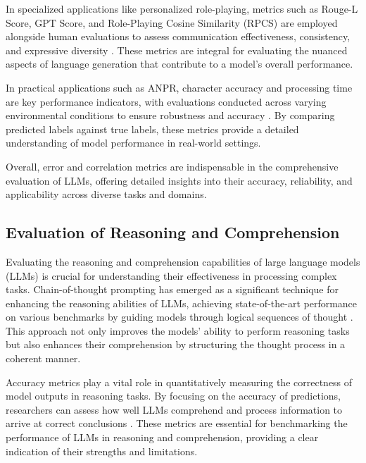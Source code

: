 In specialized applications like personalized role-playing, metrics such as Rouge-L Score, GPT Score, and Role-Playing Cosine Similarity (RPCS) are employed alongside human evaluations to assess communication effectiveness, consistency, and expressive diversity \cite{tao2024rolecraftglmadvancingpersonalizedroleplaying}. These metrics are integral for evaluating the nuanced aspects of language generation that contribute to a model's overall performance.



In practical applications such as ANPR, character accuracy and processing time are key performance indicators, with evaluations conducted across varying environmental conditions to ensure robustness and accuracy \cite{adak2022automaticnumberplaterecognition}. By comparing predicted labels against true labels, these metrics provide a detailed understanding of model performance in real-world settings.



Overall, error and correlation metrics are indispensable in the comprehensive evaluation of LLMs, offering detailed insights into their accuracy, reliability, and applicability across diverse tasks and domains.



\subsection{Evaluation of Reasoning and Comprehension} \label{subsec:Evaluation of Reasoning and Comprehension}



Evaluating the reasoning and comprehension capabilities of large language models (LLMs) is crucial for understanding their effectiveness in processing complex tasks. Chain-of-thought prompting has emerged as a significant technique for enhancing the reasoning abilities of LLMs, achieving state-of-the-art performance on various benchmarks by guiding models through logical sequences of thought \cite{wei2022chain}. This approach not only improves the models' ability to perform reasoning tasks but also enhances their comprehension by structuring the thought process in a coherent manner.



Accuracy metrics play a vital role in quantitatively measuring the correctness of model outputs in reasoning tasks. By focusing on the accuracy of predictions, researchers can assess how well LLMs comprehend and process information to arrive at correct conclusions \cite{kojima2022large}. These metrics are essential for benchmarking the performance of LLMs in reasoning and comprehension, providing a clear indication of their strengths and limitations.



